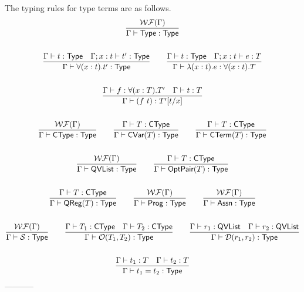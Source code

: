 The typing rules for type terms are as follows.
\begin{gather*}
    \frac{\mathcal{WF}(\Gamma)}{\Gamma \vdash \textsf{Type} : \textsf{Type}} \\
    \\
    \frac{\Gamma \vdash t : \textsf{Type} \quad \Gamma; x:t \vdash t' : \textsf{Type}}{\Gamma \vdash \forall (x:t). t' : \textsf{Type}}
    \qquad
    \frac{\Gamma \vdash t : \textsf{Type} \quad \Gamma; x:t \vdash e : T}{\Gamma \vdash \lambda (x:t). e : \forall (x:t). T} \\
    \\
    \frac{\Gamma \vdash f : \forall (x : T). T' \quad \Gamma \vdash t : T}{\Gamma \vdash (f\ t) : T'[t/x]}\\
    \\
    \frac{\mathcal{WF}(\Gamma)}{\Gamma \vdash \textsf{CType} : \textsf{Type}}
    \qquad
    \frac{\Gamma \vdash T : \textsf{CType}}{\Gamma \vdash \textsf{CVar}(T) : \textsf{Type}}
    \qquad
    \frac{\Gamma \vdash T : \textsf{CType}}{\Gamma \vdash \textsf{CTerm}(T) : \textsf{Type} }
    \\
    \\
    \frac{\mathcal{WF}(\Gamma)}{\Gamma \vdash \textsf{QVList} : \textsf{Type}}
    \qquad
    \frac{\Gamma \vdash T : \textsf{CType}}{\Gamma \vdash \textsf{OptPair}(T) : \textsf{Type}}\\
    \\
    \frac{\Gamma \vdash T : \textsf{CType}}{\Gamma \vdash \textsf{QReg}(T) : \textsf{Type}}
    \qquad
    \frac{\mathcal{WF}(\Gamma)}{\Gamma \vdash \textsf{Prog} : \textsf{Type}} 
    \qquad
    \frac{\mathcal{WF}(\Gamma)}{\Gamma \vdash \textsf{Assn} : \textsf{Type}}
    \\
    \\
    \frac{\mathcal{WF}(\Gamma)}{\Gamma \vdash \mathcal{S} : \textsf{Type}}
    \qquad
    \frac{\Gamma \vdash T_1 : \textsf{CType} \quad \Gamma \vdash T_2 : \textsf{CType}}{\Gamma \vdash \mathcal{O}(T_1, T_2) : \textsf{Type}}
    \qquad
    \frac{\Gamma \vdash r_1 : \textsf{QVList} \quad \Gamma \vdash r_2 : \textsf{QVList}}{\Gamma \vdash \mathcal{D}(r_1, r_2) : \textsf{Type}} 
    \\
    \\
    \frac{\Gamma \vdash t_1 : T \quad \Gamma \vdash t_2 : T}{\Gamma \vdash t_1 = t_2 : \textsf{Type}}
\end{gather*}
-----------
